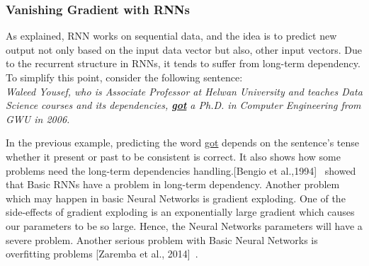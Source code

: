  \subsubsection{Vanishing Gradient with RNNs}\label{Sec:RNN_Vanishing}
 
As explained, RNN works on sequential data, and the idea is to predict new output not only based on the input data vector but also, other input vectors. Due to the recurrent structure in RNNs, it tends to suffer from long-term dependency. To simplify this point, consider the following sentence:\\
\textit{Waleed Yousef, who is Associate Professor at Helwan University and teaches Data Science courses and its dependencies, \textbf{\underline{got}} a Ph.D. in Computer Engineering from GWU in 2006.}

In the previous example, predicting the word \underline{got} depends on the sentence’s tense whether it present or past to be consistent is correct. It also shows how some problems need the long-term dependencies handling.[Bengio et al.,1994]~\cite{Bengio_1994} showed that Basic RNNs have a problem in long-term dependency.  Another problem which may happen in basic Neural Networks is gradient exploding. One of the side-effects of gradient exploding is an exponentially large gradient which causes our parameters to be so large. Hence, the Neural Networks parameters will have a severe problem. Another serious problem with Basic Neural Networks is overfitting problems [Zaremba et al., 2014]~\cite{Zaremba_et_al}.

